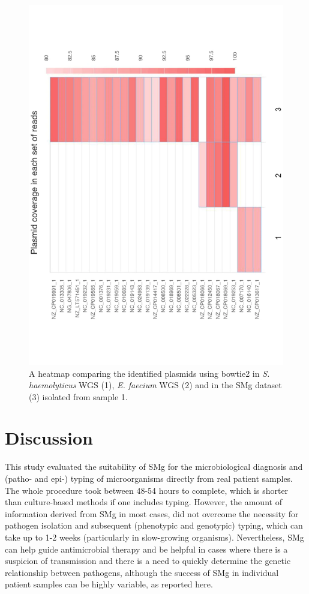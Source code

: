 \begin{figure}[h!]
\centering
\includegraphics[angle=-90,width=\textwidth]{figures/chapter 2/41598_2018_31873_Fig4_HTML.pdf}
\caption{A heatmap comparing the identified plasmids using bowtie2 in \textit{S. haemolyticus} \ac{WGS} (1),\textit{ E. faecium} \ac{WGS} (2) and in the \ac{SMg} dataset (3) isolated from sample 1.}
\label{fig:chap2_figure4}
\end{figure}

\section{Discussion}

This study evaluated the suitability of \ac{SMg} for the microbiological diagnosis and (patho- and epi-) typing of microorganisms directly from real patient samples. The whole procedure took between 48-54 hours to complete, which is shorter than culture-based methods if one includes typing. However, the amount of information derived from \ac{SMg} in most cases, did not overcome the necessity for pathogen isolation and subsequent (phenotypic and genotypic) typing, which can take up to 1-2 weeks (particularly in slow-growing organisms). Nevertheless, \ac{SMg} can help guide antimicrobial therapy and be helpful in cases where there is a suspicion of transmission and there is a need to quickly determine the genetic relationship between pathogens, although the success of \ac{SMg} in individual patient samples can be highly variable, as reported here.

